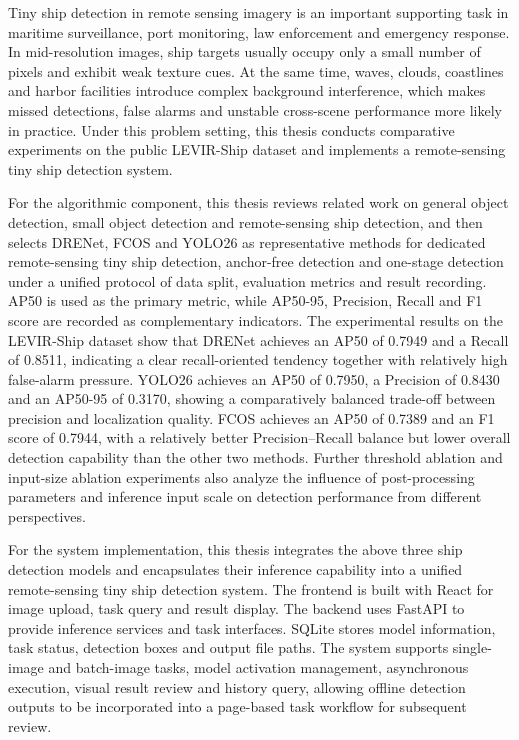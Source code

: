 \newcommand{\keywordsEn}[1][Remote Sensing Images, Tiny Ship Detection, Object Detection, Detection System, Model Evaluation]{#1}
\begin{abstractEn}
    Tiny ship detection in remote sensing imagery is an important supporting task in maritime surveillance, port monitoring, law enforcement and emergency response. In mid-resolution images, ship targets usually occupy only a small number of pixels and exhibit weak texture cues. At the same time, waves, clouds, coastlines and harbor facilities introduce complex background interference, which makes missed detections, false alarms and unstable cross-scene performance more likely in practice. Under this problem setting, this thesis conducts comparative experiments on the public LEVIR-Ship dataset and implements a remote-sensing tiny ship detection system.

    For the algorithmic component, this thesis reviews related work on general object detection, small object detection and remote-sensing ship detection, and then selects DRENet, FCOS and YOLO26 as representative methods for dedicated remote-sensing tiny ship detection, anchor-free detection and one-stage detection under a unified protocol of data split, evaluation metrics and result recording. AP50 is used as the primary metric, while AP50-95, Precision, Recall and F1 score are recorded as complementary indicators. The experimental results on the LEVIR-Ship dataset show that DRENet achieves an AP50 of 0.7949 and a Recall of 0.8511, indicating a clear recall-oriented tendency together with relatively high false-alarm pressure. YOLO26 achieves an AP50 of 0.7950, a Precision of 0.8430 and an AP50-95 of 0.3170, showing a comparatively balanced trade-off between precision and localization quality. FCOS achieves an AP50 of 0.7389 and an F1 score of 0.7944, with a relatively better Precision--Recall balance but lower overall detection capability than the other two methods. Further threshold ablation and input-size ablation experiments also analyze the influence of post-processing parameters and inference input scale on detection performance from different perspectives.

    For the system implementation, this thesis integrates the above three ship detection models and encapsulates their inference capability into a unified remote-sensing tiny ship detection system. The frontend is built with React for image upload, task query and result display. The backend uses FastAPI to provide inference services and task interfaces. SQLite stores model information, task status, detection boxes and output file paths. The system supports single-image and batch-image tasks, model activation management, asynchronous execution, visual result review and history query, allowing offline detection outputs to be incorporated into a page-based task workflow for subsequent review.
\end{abstractEn}
